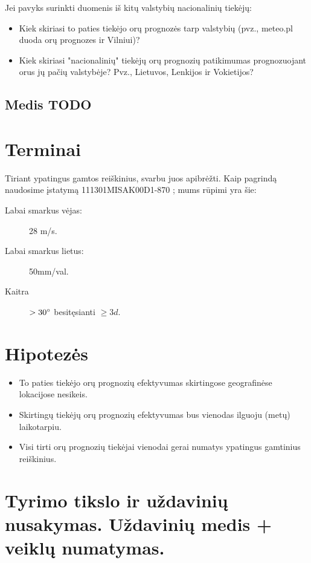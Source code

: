 \documentclass{article}
\begin{document}
Jei pavyks surinkti duomenis iš kitų valstybių nacionalinių tiekėjų:
\begin{itemize}
    \item Kiek skiriasi to paties tiekėjo orų prognozės tarp valstybių (pvz.,
        meteo.pl duoda orų prognozes ir Vilniui)?
    \item Kiek skiriasi "nacionalinių" tiekėjų orų prognozių patikimumas
        prognozuojant orus jų pačių valstybėje? Pvz., Lietuvos, Lenkijos ir
        Vokietijos?
\end{itemize}

\subsection{Medis TODO}

\section{Terminai}

Tiriant ypatingus gamtos reiškinius, svarbu juos apibrėžti. Kaip pagrindą
naudosime įstatymą 111301MISAK00D1-870 \cite{lrs-stichiniai}; mums rūpimi yra
šie:

\begin{description}
    \item[Labai smarkus vėjas:] 28 m/s.
    \item[Labai smarkus lietus:] 50mm/val.
    \item[Kaitra] $>30\degree$ besitęsianti $\geq 3d$.
\end{description}

\section{Hipotezės}

\begin{itemize}
    \item To paties tiekėjo orų prognozių efektyvumas skirtingose geografinėse
        lokacijose nesikeis.
    \item Skirtingų tiekėjų orų prognozių efektyvumas bus vienodas ilguoju
        (metų) laikotarpiu.
    \item Visi tirti orų prognozių tiekėjai vienodai gerai numatys ypatingus
        gamtinius reiškinius.
\end{itemize}

\section{Tyrimo tikslo ir uždavinių nusakymas. Uždavinių medis + veiklų numatymas.}
\end{document}
